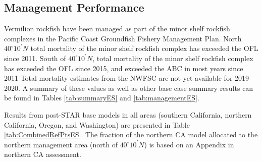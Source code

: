 \documentclass[
  english,
  a4paper,
]{article}
\begin{document}
\FloatBarrier

\hypertarget{management-performance}{%
\subsection*{Management Performance}\label{management-performance}}

Vermilion rockfish have been managed as part of the minor shelf rockfish
complexes in the Pacific Coast Groundfish Fishery Management Plan. North $40^\circ 10^\prime N$ 
total mortality of the minor shelf rockfish complex has exceeded the OFL since
2011. South of $40^\circ 10^\prime N$, total mortality of the minor shelf rockfish complex has
exceeded the OFL since 2015, and exceeded the ABC in most years since 2011
Total mortality estimates from the NWFSC are not yet available for 2019-2020.
A summary of these values as well as other base case summary results can be found
in Tables \ref{tab:summaryES} and \ref{tab:managementES}.

Results from post-STAR base models in all areas (southern California, northern
California, Oregon, and Washington) are presented in Table \ref{tab:CombinedRefPtsES}.
The fraction of the northern CA model allocated to the northern management area
(north of $40^\circ 10^\prime N$) is based on an Appendix in northern CA assessment.
\end{document}
